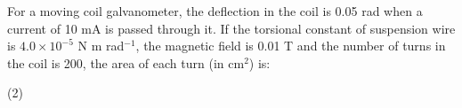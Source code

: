 \item For a moving coil galvanometer, the deflection in the coil is 0.05 rad when a current of 10 mA is passed through it. If the torsional constant of suspension wire is $4.0 \times 10^{-5}$ N m rad$^{-1}$, the magnetic field is 0.01 T and the number of turns in the coil is 200, the area of each turn (in cm$^2$) is:
    \begin{tasks}(2)
    \end{tasks}